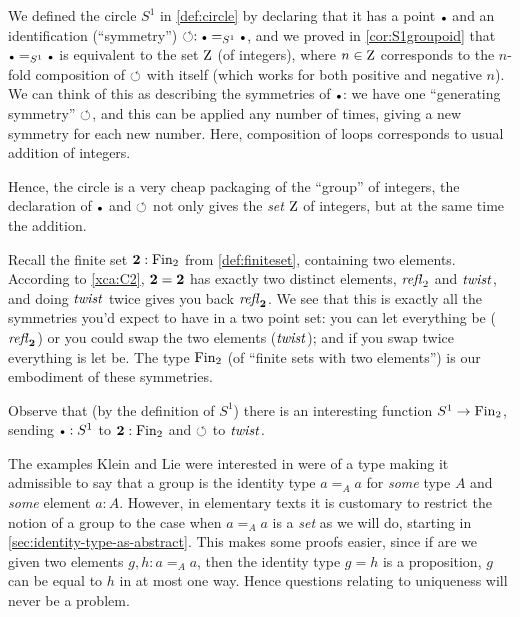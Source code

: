 \begin{example}\label{ex:base=base}
  We defined the circle $S^1$ in \cref{def:circle} by declaring that it has a point $\base$ and an identification (``symmetry'') $\Sloop:\base=_{S^1}\base$, and we proved in \cref{cor:S1groupoid} that $\base=_{S^1}\base$ is equivalent to the set $\mathrm{Z}$ (of integers), where $n\in\mathrm{Z}$ corresponds to the $n$-fold composition of $\circlearrowleft$ with itself (which works for both positive and negative $n$).  
We can think of this as describing the symmetries of $\base$: we have one ``generating symmetry'' $\circlearrowleft$, and this can be applied any number of times, giving a new symmetry for each new number.  
Here, composition of loops corresponds to usual addition of integers.  

Hence, the circle is a very cheap packaging of the ``{group}'' of integers, the declaration of $\base$ and $\circlearrowleft$ not only gives the \emph{set} $\mathrm{Z}$ of integers, but at the same time the addition.
\end{example}
\begin{example}
  Recall the finite set $\mathbf{2}:\operatorname{Fin}_2$ from \cref{def:finiteset}, containing two elements.   
According to \cref{xca:C2}, $\mathbf{2} =\mathbf{2} $ has exactly two distinct elements, $\mathop{\mathit{refl}_{\mathrm 2}}$ and $\mathit{twist}$, and doing $\mathit{twist}$ twice gives you back $\mathop{\mathit{refl}_{\mathbf{2} }}$.  
We see that this is exactly all the symmetries you'd expect to have in a two point set: you can let everything be ($\mathop{\mathit{refl}_{\mathbf{2} }}$) or you could swap the two elements ($\mathit{twist}$); and if you swap twice everything is let be.  
The type $\operatorname{Fin}_2$ (of ``finite sets with two elements'') is our embodiment of these symmetries.  

Observe that (by the definition of $S^1$) there is an interesting function $S^1\to\operatorname{Fin}_2$, sending $\base:S^1$ to $\mathbf{2} :\operatorname{Fin}_2$ and $\circlearrowleft$ to $\mathit{twist}$.
\end{example}


The examples Klein and Lie were interested in were of a type making it admissible to say that a group is the identity type $a=_Aa$ for \emph{some} type $A$ and \emph{some} element $a:A$.
However, in elementary texts it is customary to restrict the notion of a group to the case when $a=_Aa$ is a \emph{set} as we will do, starting in \cref{sec:identity-type-as-abstract}.  This makes some proofs easier, since if are we given two elements $g,h:a=_Aa$, then the identity type $g=h$ is a proposition, \ie $g$ can be equal to $h$ in at most one way.  Hence questions relating to uniqueness will never be a problem.



